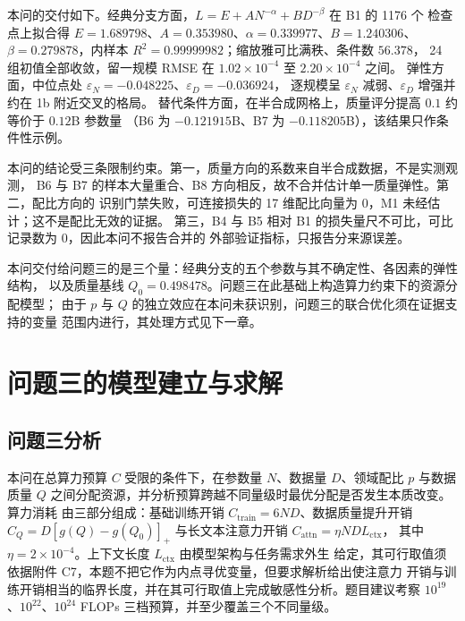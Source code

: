 \documentclass[bwprint]{gmcmthesis}
\numberwithin{equation}{section}
\numberwithin{figure}{section}
\numberwithin{table}{section}
\begin{document}
本问的交付如下。经典分支方面，$L=E+AN^{-\alpha}+BD^{-\beta}$ 在 B1 的 1176 个
检查点上拟合得 $E=1.689798$、$A=0.353980$、$\alpha=0.339977$、$B=1.240306$、
$\beta=0.279878$，内样本 $R^2=0.99999982$；缩放雅可比满秩、条件数 $56.378$，
24 组初值全部收敛，留一规模 RMSE 在 $1.02\times10^{-4}$ 至 $2.20\times10^{-4}$ 之间。
弹性方面，中位点处 $\varepsilon_N=-0.048225$、$\varepsilon_D=-0.036924$，
逐规模呈 $\varepsilon_N$ 减弱、$\varepsilon_D$ 增强并约在 1b 附近交叉的格局。
替代条件方面，在半合成网格上，质量评分提高 $0.1$ 约等价于 $0.12$B 参数量
（B6 为 $-0.121915$B、B7 为 $-0.118205$B），该结果只作条件性示例。

本问的结论受三条限制约束。第一，质量方向的系数来自半合成数据，不是实测观测，
B6 与 B7 的样本大量重合、B8 方向相反，故不合并估计单一质量弹性。第二，配比方向的
识别门禁失败，可连接损失的 17 维配比向量为 0，M1 未经估计；这不是配比无效的证据。
第三，B4 与 B5 相对 B1 的损失量尺不可比，可比记录数为 0，因此本问不报告合并的
外部验证指标，只报告分来源误差。

本问交付给问题三的是三个量：经典分支的五个参数与其不确定性、各因素的弹性结构，
以及质量基线 $Q_0=0.498478$。问题三在此基础上构造算力约束下的资源分配模型；
由于 $p$ 与 $Q$ 的独立效应在本问未获识别，问题三的联合优化须在证据支持的变量
范围内进行，其处理方式见下一章。


\clearpage
\section{问题三的模型建立与求解}



\subsection{问题三分析}

本问在总算力预算 $C$ 受限的条件下，在参数量 $N$、数据量 $D$、领域配比 $p$ 与数据
质量 $Q$ 之间分配资源，并分析预算跨越不同量级时最优分配是否发生本质改变。算力消耗
由三部分组成：基础训练开销 $C_{\mathrm{train}}=6ND$、数据质量提升开销
$C_Q=D[g(Q)-g(Q_0)]_+$ 与长文本注意力开销 $C_{\mathrm{attn}}=\eta ND L_{\mathrm{ctx}}$，
其中 $\eta=2\times10^{-4}$。上下文长度 $L_{\mathrm{ctx}}$ 由模型架构与任务需求外生
给定，其可行取值须依据附件 C7，本题不把它作为内点寻优变量，但要求解析给出使注意力
开销与训练开销相当的临界长度，并在其可行取值上完成敏感性分析。题目建议考察
$10^{19}$、$10^{22}$、$10^{24}$ FLOPs 三档预算，并至少覆盖三个不同量级。
\end{document}

